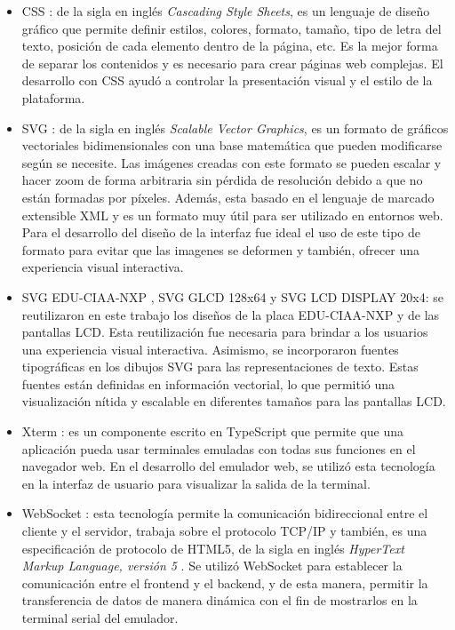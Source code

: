 \begin{itemize}
	\item CSS \citep{CSS}: de la sigla en inglés \textit{Cascading Style Sheets},
	es un lenguaje de diseño gráfico que permite definir estilos, colores, formato, tamaño, tipo de letra del texto, posición de cada elemento dentro de la página, etc. Es la mejor forma de separar los contenidos y es necesario para crear páginas web complejas. El desarrollo con CSS ayudó a controlar la presentación visual y el estilo de la plataforma.

    \item SVG \citep{SVG}: de la sigla en inglés \textit{Scalable Vector Graphics}, es un formato de gráficos vectoriales bidimensionales con una base matemática que pueden modificarse según se necesite. Las imágenes creadas con este formato se pueden escalar y hacer zoom de forma arbitraria sin pérdida de resolución debido a que no están formadas por píxeles. Además, esta basado en el lenguaje de marcado extensible XML \citep{XML} y es un formato muy útil para ser utilizado en entornos web. 
Para el desarrollo del diseño de la interfaz fue ideal el uso de este tipo de formato para evitar que las imagenes se deformen y también, ofrecer una experiencia visual interactiva.

    \item SVG EDU-CIAA-NXP \citep{SVGFirmwareV3}, SVG GLCD 128x64 y SVG LCD DISPLAY 20x4: se reutilizaron en este trabajo los diseños de la placa EDU-CIAA-NXP y de las pantallas LCD. Esta reutilización fue necesaria para brindar a los usuarios una experiencia visual interactiva. Asimismo, se incorporaron fuentes tipográficas en los dibujos SVG para las representaciones de texto. Estas fuentes  están definidas en información vectorial,  lo que permitió una visualización nítida y escalable en diferentes tamaños para las pantallas LCD.

    \item Xterm \citep{Xterm}: es un componente escrito en TypeScript \citep{TypeScript} que permite que una aplicación pueda usar terminales emuladas con todas sus funciones en el navegador web. 
En el desarrollo del emulador web, se utilizó esta tecnología en la interfaz de usuario para visualizar la salida de la terminal.

    \item WebSocket \citep{WebSocket}: esta tecnología permite la comunicación bidireccional entre el cliente y el servidor, trabaja sobre el protocolo TCP/IP y también, es una especificación de protocolo de HTML5, de la sigla en inglés \textit{HyperText Markup Language, versión 5} \citep{HTML5}. 
Se utilizó WebSocket para establecer la comunicación entre el frontend y el backend, y de esta manera, permitir la transferencia de datos de manera dinámica con el fin de mostrarlos en la terminal serial del emulador. 
       

\end{itemize}

